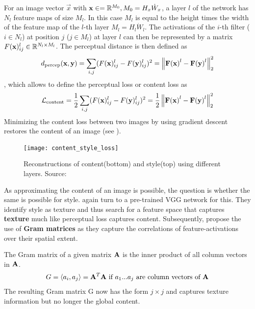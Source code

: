 For an image vector $\vec{x}$ with $\mathbf{x} \in = \mathbb{R}^{M_0}, M_0 = H_x \dot W_x $, a layer $l$ of the network has $N_l$ feature maps of size $M_l$.
In this case $M_l$ is equal to the height times the width of the feature map of the $l$-th layer  $M_l = H_l \dot W_l $.
The activations of the $i$-th filter ($i \in N_l$) at position $j$ ($j \in M_l$) at layer $l$ can then be represented by a matrix $F(\mathbf{x})_{ij}^l \in \mathbb{R}^{N_l \times M_l}$.
The perceptual distance is then defined as
\begin{align}
    d_{\text{percep}}(\mathbf{x}, \mathbf{y}) = \sum_{i, j} (F(\mathbf{x})_{ij}^l - F(\mathbf{y})_{ij}^l)^2 = \left\lVert\mathbf{F(\mathbf{x})}^l - \mathbf{F(\mathbf{y})}^l\right\rVert_2^2
\end{align}
, which allows to define the perceptual loss or content loss as 
\begin{align}
    \mathcal{L}_{\text{content}} = \frac{1}{2} \sum_{i, j} (F(\mathbf{x})_{ij}^l - F(\mathbf{y})_{ij}^l)^2 = \frac{1}{2} \left\lVert\mathbf{F(\mathbf{x})}^l - \mathbf{F(\mathbf{y})}^l\right\rVert_2^2
\end{align}
Minimizing the content loss between two images by using gradient descent restores the content of an image (see ).
\begin{figure}
    \texttt{[image: content\_style\_loss]}
    \caption{Reconstructions of content(bottom) and style(top) using different layers. Source:\cite{gatys}}
\end{figure}

As approximating the content of an image is possible, the question is whether the same is possible for style.
\citeauthor*{gatys} again turn to a pre-trained VGG network for this.
They identify style as texture and thus search for a feature space that captures \textbf{texture} much like perceptual loss captures content.
Subsequently, \citeauthor*{gatys} propose the use of \textbf{Gram matrices} as they capture the correlations of feature-activations over their spatial extent.

The Gram matrix of a given matrix $\mathbf{A}$ is the inner product of all column vectors in $\mathbf{A}$.
\begin{align}
    G = \langle a_{i}, a_{j} \rangle = \mathbf{A}^T \mathbf{A} \text{ if $a_1$...$a_j$ are column vectors of $\mathbf{A}$}
\end{align}
The resulting Gram matrix G now has the form $j \times j$ and captures texture information but no longer the global content.

